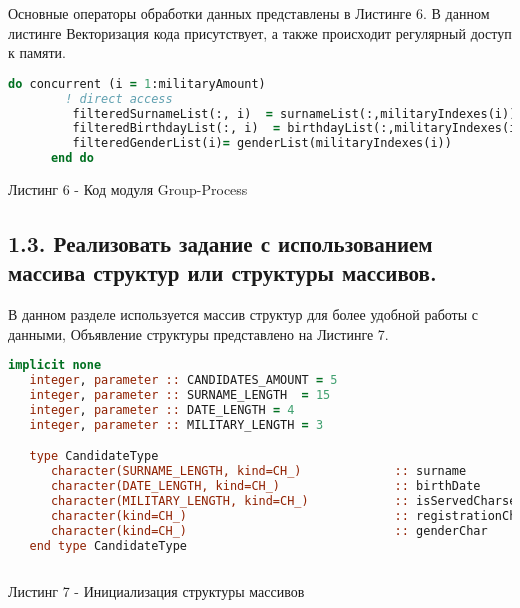 \documentclass[12pt, a4paper]{report}
\begin{document}
Основные операторы обработки данных представлены в Листинге 6. В данном листинге Векторизация кода присутствует, а также происходит регулярный доступ к памяти. 
\begin{lstlisting}[language=Fortran]
   do concurrent (i = 1:militaryAmount)
        ! direct access
         filteredSurnameList(:, i)  = surnameList(:,militaryIndexes(i))
         filteredBirthdayList(:, i)  = birthdayList(:,militaryIndexes(i))
         filteredGenderList(i)= genderList(militaryIndexes(i))
      end do
         \end{lstlisting}
\begin{center}
Листинг 6 - Код модуля Group-Process
\end{center}

\newpage



\begin{center}
\subsection*{1.3. Реализовать задание с использованием массива структур или структуры массивов. }
\end{center}

В данном разделе используется массив структур для более удобной работы с данными,
Объявление структуры представлено на Листинге 7.
\begin{lstlisting}[language=Fortran]
  implicit none
   integer, parameter :: CANDIDATES_AMOUNT = 5
   integer, parameter :: SURNAME_LENGTH  = 15
   integer, parameter :: DATE_LENGTH = 4
   integer, parameter :: MILITARY_LENGTH = 3

   type CandidateType
      character(SURNAME_LENGTH, kind=CH_)             :: surname           = ""
      character(DATE_LENGTH, kind=CH_)                :: birthDate         = ""
      character(MILITARY_LENGTH, kind=CH_)            :: isServedCharset   = ""
      character(kind=CH_)                             :: registrationCharset  = ""
      character(kind=CH_)                             :: genderChar        = ""
   end type CandidateType
   
\end{lstlisting}
\begin{center}
Листинг 7 - Инициализация структуры массивов
\end{center}
\end{document}
